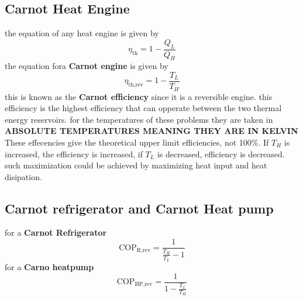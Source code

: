 \documentclass[14pt]{article}
\begin{document}
\subsection{Carnot Heat Engine}
the equation of any heat engine is given by \begin{equation}
   \eta _{\text{th}} = 1 - \dfrac{Q_L}{Q_H}
\end{equation}
the equation fora \textbf{Carnot engine} is given by \begin{equation}
   \eta _{\text{th,rev}} = 1 - \dfrac{T_L}{T_H}
\end{equation}
this is known as the \textbf{Carnot efficiency} since it is a reversible engine. this efficiency is the highest efficiency that can opperate between the two thermal energy reservoirs. for the temperatures of these problems they are taken in \textbf{ABSOLUTE TEMPERATURES MEANING THEY ARE IN KELVIN}
These effecencies give the theoretical upper limit efficiencies, not 100\%.
If $T_H$ is increased, the efficiency is increased, if $T_L$ is decreased, efficiency is decreased. such maximization could be achieved by maximizing heat input and heat disipation. 
\subsection{Carnot refrigerator and Carnot Heat pump}
for a \textbf{Carnot Refrigerator}
\begin{equation}
   \text{COP}_{\text{R,rev}} = \dfrac{1}{\frac{T_H}{T_L} - 1}
\end{equation}
for a \textbf{Carno heatpump}
\begin{equation}
   \text{COP}_{\text{HP,rev}} = \dfrac{1}{1 - \frac{T_L}{T_H}}
\end{equation}
\end{document}
